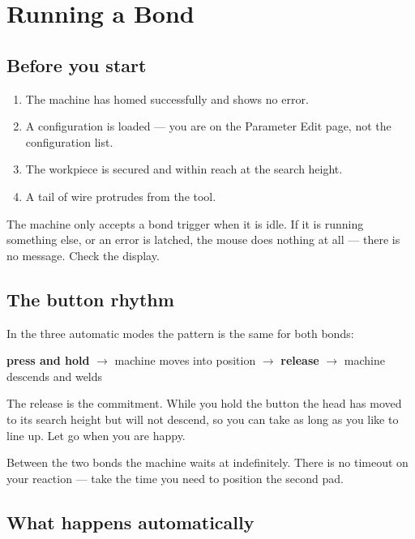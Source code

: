\chapter{Running a Bond}
\label{ch:running}

\section{Before you start}

\begin{enumerate}[leftmargin=*]
\item The machine has homed successfully and shows no error.
\item A configuration is loaded --- you are on the Parameter Edit page, not the
  configuration list.
\item The workpiece is secured and within reach at the search height.
\item A tail of wire protrudes from the tool.
\end{enumerate}

\begin{wbnote}
The machine only accepts a bond trigger when it is idle. If it is running
something else, or an error is latched, the mouse does nothing at all --- there
is no message. Check the display.
\end{wbnote}

\section{The button rhythm}

In the three automatic modes the pattern is the same for both bonds:

\begin{center}
\textbf{press and hold} $\rightarrow$ machine moves into position $\rightarrow$
\textbf{release} $\rightarrow$ machine descends and welds
\end{center}

The release is the commitment. While you hold the button the head has moved to
its search height but will not descend, so you can take as long as you like to
line up. Let go when you are happy.

Between the two bonds the machine waits at 
indefinitely. There is no timeout on your reaction --- take the time you need
to position the second pad.

\section{What happens automatically}

